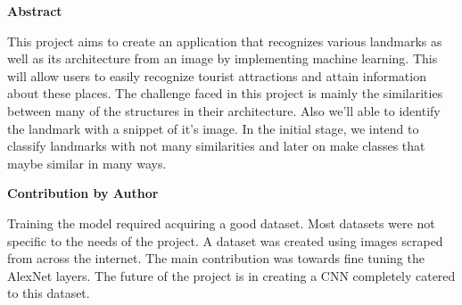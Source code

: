 \documentclass[10pt]{article} %
\begin{document}
\noindent 
\newpage
\begin{Center}

   

             \textbf{\Large Abstract}

\noindent \textbf{}

\noindent \textbf{}

\vspace{30mm}
\justifying
\begin{spacing}{1.5}
This project aims to create an application that recognizes various landmarks as well as its architecture from an image by implementing machine learning. This will allow users to easily recognize tourist attractions and attain information about these places. The challenge faced in this project is mainly the similarities between many of the structures in their architecture. Also we'll able to identify the landmark with a snippet of it's image. In the initial stage, we intend to classify landmarks with not many similarities and later on make classes that maybe similar in many ways.
\end{spacing}
\end{Center}
\newpage
\begin{Center}


\noindent \textbf{\Large Contribution by Author}

\vspace{20mm} 
\justifying
\begin{spacing}{1.5}
\noindent Training the model required acquiring a good dataset. Most datasets were not specific to the needs of the project. A dataset was created using images scraped from across the internet. The main contribution was towards fine tuning the AlexNet layers. The future of the project is in creating a CNN completely catered to this dataset.
\end{spacing}
\end{Center}
\newpage
\end{document}
